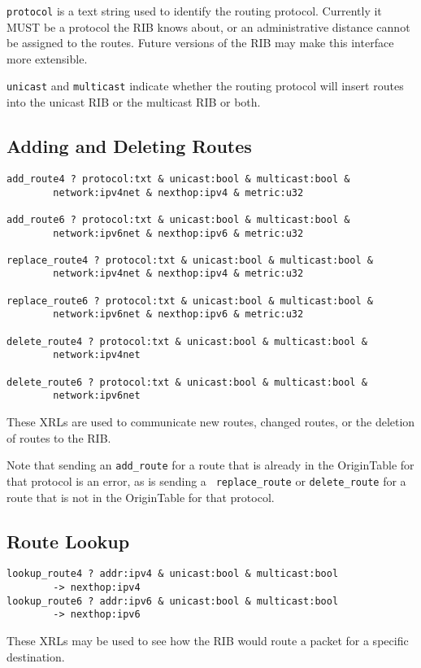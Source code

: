 \documentclass[11pt]{article}
\begin{document}
{\tt protocol} is a text string used to identify the routing protocol.
Currently it MUST be a protocol the RIB knows about, or an
administrative distance cannot be assigned to the routes.  Future
versions of the RIB may make this interface more extensible.

{\tt unicast} and {\tt multicast} indicate whether the routing
protocol will insert routes into the unicast RIB or the multicast RIB
or both.

\subsection{Adding and Deleting Routes}
\begin{verbatim}
add_route4 ? protocol:txt & unicast:bool & multicast:bool & 
        network:ipv4net & nexthop:ipv4 & metric:u32

add_route6 ? protocol:txt & unicast:bool & multicast:bool & 
        network:ipv6net & nexthop:ipv6 & metric:u32

replace_route4 ? protocol:txt & unicast:bool & multicast:bool & 
        network:ipv4net & nexthop:ipv4 & metric:u32

replace_route6 ? protocol:txt & unicast:bool & multicast:bool & 
        network:ipv6net & nexthop:ipv6 & metric:u32

delete_route4 ? protocol:txt & unicast:bool & multicast:bool & 
        network:ipv4net

delete_route6 ? protocol:txt & unicast:bool & multicast:bool & 
        network:ipv6net
\end{verbatim}
These XRLs are used to communicate new routes, changed routes, or the
deletion of routes to the RIB.

Note that sending an {\tt add\_route} for a route that is already in
the OriginTable for that protocol is an error, as is sending a {\tt
replace\_route} or {\tt delete\_route} for a route that is not in the
OriginTable for that protocol.

\subsection{Route Lookup}
\begin{verbatim}
lookup_route4 ? addr:ipv4 & unicast:bool & multicast:bool 
        -> nexthop:ipv4
lookup_route6 ? addr:ipv6 & unicast:bool & multicast:bool 
        -> nexthop:ipv6
\end{verbatim}
These XRLs may be used to see how the RIB would route a packet for a
specific destination.
\end{document}
